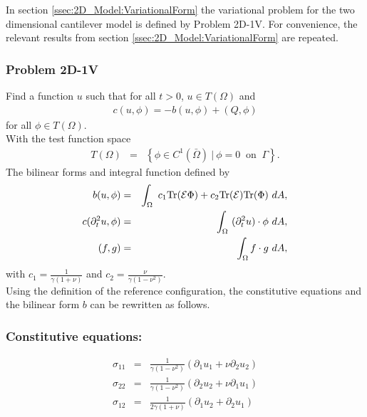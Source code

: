 \documentclass[../../main.tex]{subfiles}
\begin{document}
In section \ref{ssec:2D_Model:VariationalForm} the variational problem for the two dimensional cantilever model is defined by Problem 2D-1V. For convenience, the relevant results from section \ref{ssec:2D_Model:VariationalForm} are repeated.
\subsubsection{Problem 2D-1V}\label{sssec:2D_Model:Problem2D1VChp5}
Find a function $u$ such that for all $t>0$, $u \in T(\Omega)$ and 
\begin{align}
	c(u,\phi) = -b(u,\phi) + (Q,\phi) \label{eq:2D_Model:Problem2D1VEqChp5}
\end{align}
for all $\phi \in T(\Omega)$.\\

With the test function space 
\begin{eqnarray*}
	T(\Omega) & = & \left\{ \phi \in C^1(\bar{\Omega}) \ | \ \phi = 0 \ \textrm{ on } \ \Gamma \right\}.
\end{eqnarray*}
The bilinear forms and integral function defined by
\begin{eqnarray}
	b(u,\phi) & = & \int_\Omega~c_1\textrm{Tr}({\cal E}\Phi)+ c_2\textrm{Tr}({\cal E})
	\textrm{Tr}(\Phi) ~dA, \label{eq:2D_Model:BilinearChp5}\\
	c(\partial_t^2 u,\phi) & = & \int_\Omega~ (\partial^2_t u) \cdot \phi~dA, \label{eq:2D_Model:Bilinear_cChp5}\\
	(f,g) &=& \int_{\Omega} f\cdot g \ dA, \label{eq:2D_Model:Bilinear_intChp5}
\end{eqnarray}
with $\displaystyle c_1 = \frac{1}{\gamma(1+\nu)}$ and $\displaystyle c_2 = \frac{\nu}{\gamma(1-\nu^2)}$.\\

Using the definition of the reference configuration, the constitutive equations and the bilinear form $b$ can be rewritten as follows.

\subsubsection{Constitutive equations:}
\begin{eqnarray}
	\sigma_{11} & = & \frac{1}{\gamma(1-\nu^2)}(\partial_1 u_1 + \nu \partial_2 u_2) \label{CE1} \\
	\sigma_{22} & = & \frac{1}{\gamma(1-\nu^2)}(\partial_2 u_2 + \nu \partial_1 u_1) \label{CE2} \\
	\sigma_{12} & = & \frac{1}{2\gamma(1+\nu)}(\partial_1 u_2 + \partial_2 u_1) \label{CE3}
\end{eqnarray}
\end{document}

